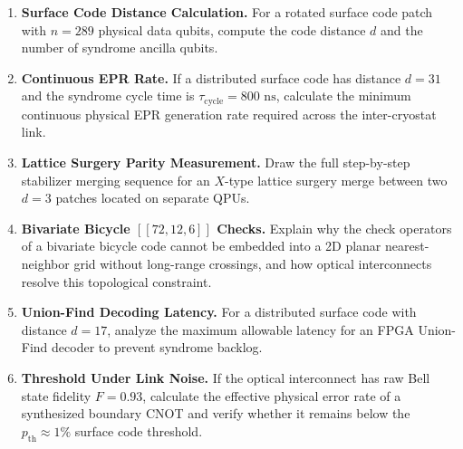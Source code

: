 \begin{enumerate}[label=\textbf{13.\arabic*.}]
    \item \textbf{Surface Code Distance Calculation.} For a rotated surface code patch with $n = 289$ physical data qubits, compute the code distance $d$ and the number of syndrome ancilla qubits.
    \item \textbf{Continuous EPR Rate.} If a distributed surface code has distance $d = 31$ and the syndrome cycle time is $\tau_{\text{cycle}} = 800\text{ ns}$, calculate the minimum continuous physical EPR generation rate required across the inter-cryostat link.
    \item \textbf{Lattice Surgery Parity Measurement.} Draw the full step-by-step stabilizer merging sequence for an $X$-type lattice surgery merge between two $d=3$ patches located on separate QPUs.
    \item \textbf{Bivariate Bicycle $[[72, 12, 6]]$ Checks.} Explain why the check operators of a bivariate bicycle code cannot be embedded into a 2D planar nearest-neighbor grid without long-range crossings, and how optical interconnects resolve this topological constraint.
    \item \textbf{Union-Find Decoding Latency.} For a distributed surface code with distance $d=17$, analyze the maximum allowable latency for an FPGA Union-Find decoder to prevent syndrome backlog.
    \item \textbf{Threshold Under Link Noise.} If the optical interconnect has raw Bell state fidelity $F = 0.93$, calculate the effective physical error rate of a synthesized boundary CNOT and verify whether it remains below the $p_{\text{th}} \approx 1\%$ surface code threshold.
\end{enumerate}
